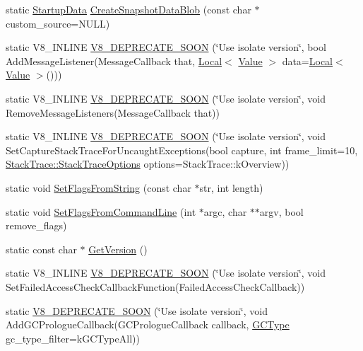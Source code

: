 \begin{DoxyCompactItemize}
\item 
static \hyperlink{classv8_1_1StartupData}{Startup\+Data} \hyperlink{classv8_1_1V8_a0afd98f054412cf57318c0657e9a393f}{Create\+Snapshot\+Data\+Blob} (const char $\ast$custom\+\_\+source=N\+U\+L\+L)
\item 
static V8\+\_\+\+I\+N\+L\+I\+N\+E \hyperlink{classv8_1_1V8_ae3a6851b1385fb066e3ce7495568d7ef}{V8\+\_\+\+D\+E\+P\+R\+E\+C\+A\+T\+E\+\_\+\+S\+O\+O\+N} (\char`\"{}Use isolate version\char`\"{}, bool Add\+Message\+Listener(Message\+Callback that, \hyperlink{classv8_1_1Local}{Local}$<$ \hyperlink{classv8_1_1Value}{Value} $>$ data=\hyperlink{classv8_1_1Local}{Local}$<$ \hyperlink{classv8_1_1Value}{Value} $>$()))
\item 
static V8\+\_\+\+I\+N\+L\+I\+N\+E \hyperlink{classv8_1_1V8_ad5bf86b0395f54cc9dca3b21b51912f7}{V8\+\_\+\+D\+E\+P\+R\+E\+C\+A\+T\+E\+\_\+\+S\+O\+O\+N} (\char`\"{}Use isolate version\char`\"{}, void Remove\+Message\+Listeners(Message\+Callback that))
\item 
static V8\+\_\+\+I\+N\+L\+I\+N\+E \hyperlink{classv8_1_1V8_af7ebf115567fe23fa29fb33b51736fde}{V8\+\_\+\+D\+E\+P\+R\+E\+C\+A\+T\+E\+\_\+\+S\+O\+O\+N} (\char`\"{}Use isolate version\char`\"{}, void Set\+Capture\+Stack\+Trace\+For\+Uncaught\+Exceptions(bool capture, int frame\+\_\+limit=10, \hyperlink{classv8_1_1StackTrace_a9704e4a37949eb8eb8ccddbddf161492}{Stack\+Trace\+::\+Stack\+Trace\+Options} options=Stack\+Trace\+::k\+Overview))
\item 
static void \hyperlink{classv8_1_1V8_ab263a85e6f97ea79d944bd20bb09a95f}{Set\+Flags\+From\+String} (const char $\ast$str, int length)
\item 
static void \hyperlink{classv8_1_1V8_a63157ad9284ffad1c0ab62b21aadd08c}{Set\+Flags\+From\+Command\+Line} (int $\ast$argc, char $\ast$$\ast$argv, bool remove\+\_\+flags)
\item 
static const char $\ast$ \hyperlink{classv8_1_1V8_afcecc0e9e8b5fa17a06a93f7b5a7538d}{Get\+Version} ()
\item 
static V8\+\_\+\+I\+N\+L\+I\+N\+E \hyperlink{classv8_1_1V8_afa2e4ebb75e5284c483cbadd886036c4}{V8\+\_\+\+D\+E\+P\+R\+E\+C\+A\+T\+E\+\_\+\+S\+O\+O\+N} (\char`\"{}Use isolate version\char`\"{}, void Set\+Failed\+Access\+Check\+Callback\+Function(Failed\+Access\+Check\+Callback))
\item 
static \hyperlink{classv8_1_1V8_a82c430ed4a795b66727174223fe9726d}{V8\+\_\+\+D\+E\+P\+R\+E\+C\+A\+T\+E\+\_\+\+S\+O\+O\+N} (\char`\"{}Use isolate version\char`\"{}, void Add\+G\+C\+Prologue\+Callback(G\+C\+Prologue\+Callback callback, \hyperlink{namespacev8_ac109d6f27e0c0f9ef4e98bcf7a806cf2}{G\+C\+Type} gc\+\_\+type\+\_\+filter=k\+G\+C\+Type\+All))
$$
\end{DoxyCompactItemize}
